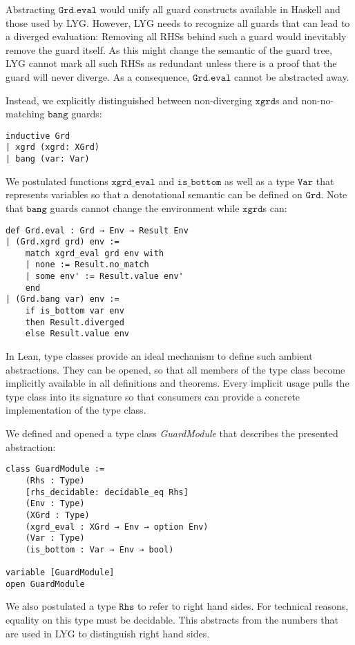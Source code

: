 Abstracting $\mathtt{Grd.eval}$ would unify all guard constructs available in Haskell and those used by LYG.
However, LYG needs to recognize all guards that can lead to a diverged evaluation:
Removing all RHSs behind such a guard would inevitably remove the guard itself.
As this might change the semantic of the guard tree, LYG cannot mark all such RHSs as redundant unless there is a proof that the guard will never diverge.
As a consequence, $\mathtt{Grd.eval}$ cannot be abstracted away.

Instead, we explicitly distinguished between non-diverging $\mathtt{xgrd}$s and non-no-matching $\mathtt{bang}$ guards:
\begin{verbatim}
inductive Grd
| xgrd (xgrd: XGrd)
| bang (var: Var)
\end{verbatim}

We postulated functions $\mathtt{xgrd\_eval}$ and $\mathtt{is\_bottom}$ as well as a type $\mathtt{Var}$ that represents variables so that
a denotational semantic can be defined on $\mathtt{Grd}$. Note that $\mathtt{bang}$ guards cannot change the environment while $\mathtt{xgrd}$s can:

\begin{verbatim}
def Grd.eval : Grd → Env → Result Env
| (Grd.xgrd grd) env :=
    match xgrd_eval grd env with
    | none := Result.no_match
    | some env' := Result.value env'
    end
| (Grd.bang var) env :=
    if is_bottom var env
    then Result.diverged
    else Result.value env
\end{verbatim}

In Lean, type classes provide an ideal mechanism to define such ambient abstractions.
They can be opened, so that all members of the type class become implicitly available in all definitions and theorems.
Every implicit usage pulls the type class into its signature so that consumers can provide a concrete implementation of the type class.

We defined and opened a type class \textit{GuardModule} that describes the presented abstraction:

\begin{verbatim}
class GuardModule :=
    (Rhs : Type)
    [rhs_decidable: decidable_eq Rhs]
    (Env : Type)
    (XGrd : Type)
    (xgrd_eval : XGrd → Env → option Env)
    (Var : Type)
    (is_bottom : Var → Env → bool)

variable [GuardModule]
open GuardModule
\end{verbatim}

We also postulated a type $\mathtt{Rhs}$ to refer to right hand sides. For technical reasons, equality on this type must be decidable.
This abstracts from the numbers that are used in LYG to distinguish right hand sides.

